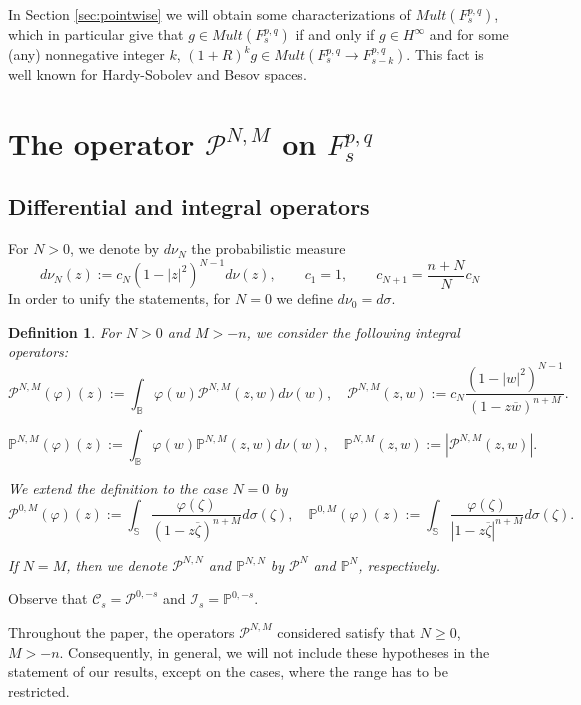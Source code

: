 \documentclass[12pt,twoside,leqno,final]{amsart}
\theoremstyle{plain}
\newtheorem{defn}[thm]{Definition}
\begin{document}
In Section \ref{sec:pointwise} we will obtain some characterizations of $Mult(F^{p,q}_s)$, 
which in particular give that $g\in Mult(F^{p,q}_s)$ if and only if $g\in H^\infty$ 
and for some (any) nonnegative integer $k$, $(1+R)^k g\in Mult(F^{p,q}_{s}\to F^{p,q}_{s-k})$. 
This fact is well known for Hardy-Sobolev and Besov spaces.

\section{The operator ${{\mathcal P}}^{N,M}$ on $F^{p,q}_s$}\label{sec:operatorPNMF}

\subsection{Differential and integral operators}

For $N>0$, we denote by $d\nu_N$ the probabilistic measure 
$$
d\nu_N(z):=c_N(1-|z|^2)^{N-1}d\nu(z), \qquad 
c_1=1, \qquad c_{N+1}=\frac{n+N}N c_N
$$
In order to unify the statements, for $N=0$ we define 
$d\nu_0=d\sigma$.

\begin{defn}
For $N>0$ and $M>-n$, we consider the following integral operators:
$$
{{\mathcal P}}^{N,M}(\varphi)(z):=\int_{{\mathbb B}} \varphi(w) {{\mathcal P}}^{N,M}(z,w)d\nu(w),\quad {{\mathcal P}}^{N,M}(z,w):=c_N\frac{(1-|w|^2)^{N-1}}{(1-z\overline w)^{n+M}}.
$$

$$
{\mathbb{P}}^{N,M}(\varphi)(z):=\int_{{\mathbb B}} \varphi(w){\mathbb{P}}^{N,M}(z,w)d\nu(w),\quad {\mathbb{P}}^{N,M}(z,w):=|{{\mathcal P}}^{N,M}(z,w)|.
$$

We extend the definition to the case $N=0$ by 
$$
{{\mathcal P}}^{0,M}(\varphi)(z):=\int_{{\mathbb S}} \frac{\varphi({\zeta})}{(1-z\overline {\zeta})^{n+M}}d\sigma({\zeta}),\quad {\mathbb{P}}^{0,M}(\varphi)(z):=\int_{{\mathbb S}} \frac{\varphi({\zeta})}{|1-z\overline {\zeta}|^{n+M}}d\sigma({\zeta}).
$$

If $N=M$, then we denote ${{\mathcal P}}^{N,N}$ and ${\mathbb{P}}^{N,N}$ by ${{\mathcal P}}^N$ and  ${\mathbb{P}}^N$, respectively. 
\end{defn}

Observe that  ${\mathcal C}_s={{\mathcal P}}^{0,-s}$ and ${\mathcal I}_s={\mathbb{P}}^{0,-s}$.

Throughout the paper, the operators ${{\mathcal P}}^{N,M}$ considered satisfy that $N\geq 0$, $M>-n$. Consequently, in general, we will not include these hypotheses in the statement of our results, except on the cases, where the range has to be restricted.
\end{document}
